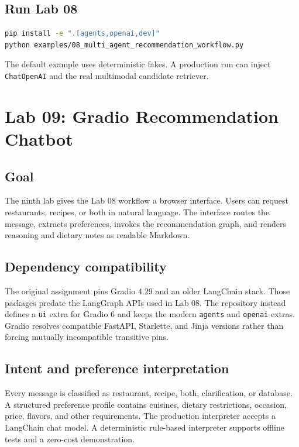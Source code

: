 \documentclass[11pt]{article}
\begin{document}
\subsection{Run Lab 08}

\begin{lstlisting}[language=bash]
pip install -e ".[agents,openai,dev]"
python examples/08_multi_agent_recommendation_workflow.py
\end{lstlisting}

The default example uses deterministic fakes. A production run can inject
\texttt{ChatOpenAI} and the real multimodal candidate retriever.

\section{Lab 09: Gradio Recommendation Chatbot}

\subsection{Goal}

The ninth lab gives the Lab 08 workflow a browser interface. Users can request
restaurants, recipes, or both in natural language. The interface routes the
message, extracts preferences, invokes the recommendation graph, and renders
reasoning and dietary notes as readable Markdown.

\subsection{Dependency compatibility}

The original assignment pins Gradio 4.29 and an older LangChain stack. Those
packages predate the LangGraph APIs used in Lab 08. The repository instead
defines a \texttt{ui} extra for Gradio 6 and keeps the modern \texttt{agents}
and \texttt{openai} extras. Gradio resolves compatible FastAPI, Starlette, and
Jinja versions rather than forcing mutually incompatible transitive pins.

\subsection{Intent and preference interpretation}

Every message is classified as restaurant, recipe, both, clarification, or
database. A structured preference profile contains cuisines, dietary
restrictions, occasion, price, flavors, and other requirements. The production
interpreter accepts a LangChain chat model. A deterministic rule-based
interpreter supports offline tests and a zero-cost demonstration.
\end{document}
